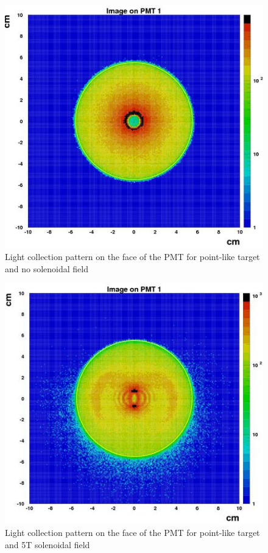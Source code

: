\begin{figure}[!h]
    \centering
    \includegraphics[width=1.0\linewidth,trim={0.0cm 0.0cm 0.0cm 0.0cm},clip]{images/Point_Targ_Zero_Field_PMT.jpg}
    \caption{Light collection pattern on the face of the PMT for point-like target and no solenoidal field}
    \label{fig:Point_Targ_Zero_Field_PMT}
\end{figure}

\begin{figure}[!h]
    \centering
    \includegraphics[width=1.0\linewidth,trim={0.0cm 0.0cm 0.0cm 0.0cm},clip]{images/Point_Targ_5T_Field_PMT.jpg}
    \caption{Light collection pattern on the face of the PMT for point-like target and 5T solenoidal field}
    \label{fig:Point_Targ_5T_Field_PMT}
\end{figure}

